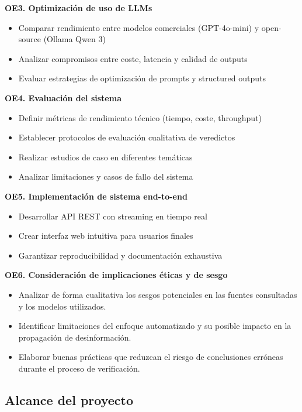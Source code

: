\documentclass[12pt,a4paper]{article}
\begin{document}
\textbf{OE3. Optimización de uso de LLMs}
\begin{itemize}
    \item Comparar rendimiento entre modelos comerciales (GPT-4o-mini) y open-source (Ollama Qwen 3)
    \item Analizar compromisos entre coste, latencia y calidad de outputs
    \item Evaluar estrategias de optimización de prompts y structured outputs
\end{itemize}

\textbf{OE4. Evaluación del sistema}
\begin{itemize}
    \item Definir métricas de rendimiento técnico (tiempo, coste, throughput)
    \item Establecer protocolos de evaluación cualitativa de veredictos
    \item Realizar estudios de caso en diferentes temáticas
    \item Analizar limitaciones y casos de fallo del sistema
\end{itemize}

\textbf{OE5. Implementación de sistema end-to-end}
\begin{itemize}
    \item Desarrollar API REST con streaming en tiempo real
    \item Crear interfaz web intuitiva para usuarios finales
    \item Garantizar reproducibilidad y documentación exhaustiva
\end{itemize}

\textbf{OE6. Consideración de implicaciones éticas y de sesgo}
\begin{itemize}
    \item Analizar de forma cualitativa los sesgos potenciales en las fuentes consultadas y los modelos utilizados.
    \item Identificar limitaciones del enfoque automatizado y su posible impacto en la propagación de desinformación.
    \item Elaborar buenas prácticas que reduzcan el riesgo de conclusiones erróneas durante el proceso de verificación.
\end{itemize}

\subsection{Alcance del proyecto}
\end{document}
